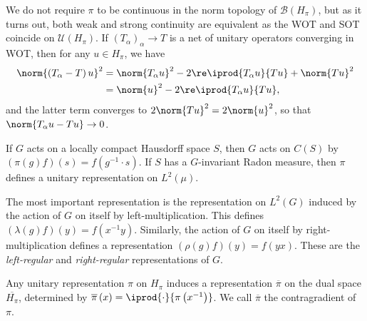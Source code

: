 \documentclass[12pt]{mypackage}
\begin{document}
We do not require $\pi$ to be continuous in the norm topology of $\mathcal{B}\left( H_{\pi} \right)$, but as it turns out, both weak and strong continuity are equivalent as the WOT and SOT coincide on $\mathcal{U}\left( H_{\pi} \right)$. If $\left( T_{\alpha} \right)_{\alpha}\rightarrow T$ is a net of unitary operators converging in WOT, then for any $u\in H_{\pi}$, we have
\begin{align*}
  \norm{\left( T_{\alpha} - T\right)u}^2 &= \norm{T_{\alpha}u}^2 - 2\re \iprod{T_{\alpha}u}{Tu} + \norm{Tu}^2\\
                                         &= \norm{u}^2 - 2\re \iprod{T_{\alpha}u}{Tu},
\end{align*}
and the latter term converges to $2\norm{Tu}^2 = 2\norm{u}^2$, so that $\norm{T_{\alpha}u-Tu}\rightarrow 0$.

If $G$ acts on a locally compact Hausdorff space $S$, then $G$ acts on $C(S)$ by $\left( \pi(g)f \right)(s) = f\left( g^{-1}\cdot s \right)$. If $S$ has a $G$-invariant Radon measure, then $\pi$ defines a unitary representation on $L^2\left( \mu \right)$.

The most important representation is the representation on $L^2(G)$ induced by the action of $G$ on itself by left-multiplication. This defines $\left( \lambda(g)f \right)(y) = f\left( x^{-1}y \right)$. Similarly, the action of $G$ on itself by right-multiplication defines a representation $\left( \rho(g)f \right)(y) = f\left( yx \right)$. These are the \textit{left-regular} and \textit{right-regular} representations of $G$.

Any unitary representation $\pi$ on $H_{\pi}$ induces a representation $ \overline{\pi} $ on the dual space $ \overline{H_{\pi}} $, determined by $ \overline{\pi}\left( x \right) = \iprod{\cdot}{\pi\left( x^{-1} \right)} $. We call $ \overline{\pi} $ the contragradient of $\pi$.
\end{document}
